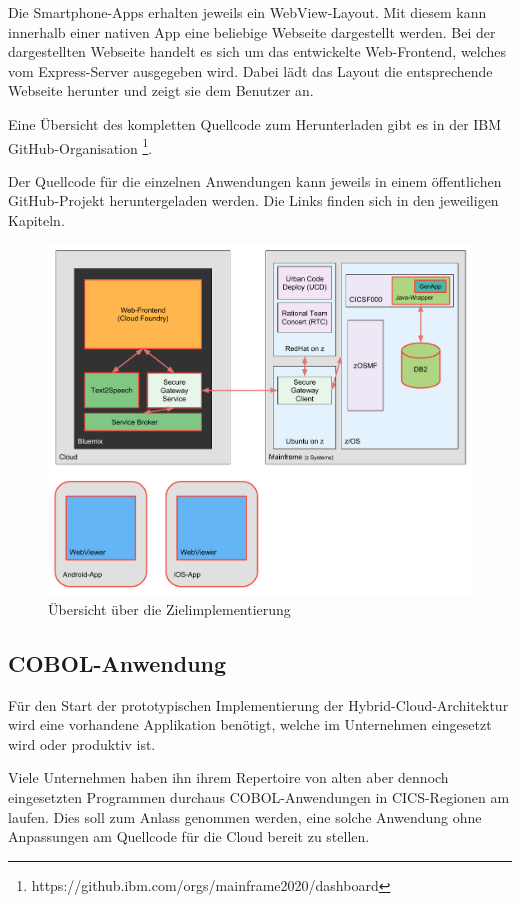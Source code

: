 Die Smartphone-Apps erhalten jeweils ein WebView-Layout. Mit diesem kann innerhalb einer nativen App eine beliebige Webseite
dargestellt werden. Bei der dargestellten Webseite handelt es sich um das entwickelte Web-Frontend, welches vom Express-Server
ausgegeben wird. Dabei lädt das Layout die entsprechende Webseite herunter und zeigt sie dem Benutzer an.

Eine Übersicht des kompletten Quellcode zum Herunterladen gibt es in der IBM GitHub-Organisation
\footnote{https://github.ibm.com/orgs/mainframe2020/dashboard}.

Der Quellcode für die einzelnen Anwendungen kann jeweils in einem öffentlichen GitHub-Projekt heruntergeladen werden. Die
Links finden sich in den jeweiligen Kapiteln.

\begin{figure}[h]
  \centering
    \includegraphics[scale=0.5]{images/kapitel_4/architektur_gesamtuebersicht.pdf}
  \caption{Übersicht über die Zielimplementierung}
  \label{fig:architektur_gesamtuebersicht}
\end{figure}

\subsection{COBOL-Anwendung}
Für den Start der prototypischen Implementierung der Hybrid-Cloud-Architektur wird eine vorhandene Applikation benötigt,
welche im Unternehmen eingesetzt wird oder produktiv ist.

Viele Unternehmen haben ihn ihrem Repertoire von alten aber dennoch eingesetzten Programmen durchaus COBOL-Anwendungen
in CICS-Regionen am laufen. Dies soll zum Anlass genommen werden, eine solche Anwendung ohne Anpassungen am Quellcode
für die Cloud bereit zu stellen.

